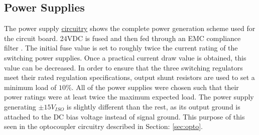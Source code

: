\subsection {Power Supplies}

The power supply \hyperlink{sch:Power}{circuitry} shows the complete power generation scheme used for the circuit board. 24VDC is fused and then fed through an EMC compliance filter \cite{5VswitchDatasheet}. The initial fuse value is set to roughly twice the current rating of the switching power supplies. Once a practical current draw value is obtained, this value can be decreased. In order to ensure that the three switching regulators meet their rated regulation specifications, output shunt resistors are used to set a minimum load of $10\%$. All of the power supplies were chosen such that their power ratings were at least twice the maximum expected load. The power supply generating $\pm 15V_{ISO}$ is slightly different than the rest, as its output ground is attached to the DC bias voltage instead of signal ground. This purpose of this seen in the optocoupler circuitry described in Section: \ref{sec:opto}.  


